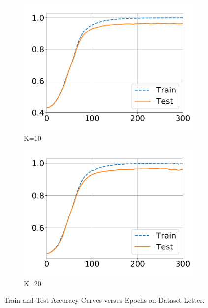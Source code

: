 \begin{figure}[!ht]
\begin{subfigure}{0.33\textwidth}
  \end{subfigure}
  \centering
  \begin{subfigure}{.33\textwidth}
    \centering
    \includegraphics[width=1\linewidth]{images/supply/train_curves/letter_10.pdf}
    \vspace{-0.8cm}
    \caption{K=10}
  \end{subfigure}
  \centering
  \begin{subfigure}{.33\textwidth}
    \centering
    \includegraphics[width=1\linewidth]{images/supply/train_curves/letter_20.pdf}
    \vspace{-0.8cm}
    \caption{K=20}
  \end{subfigure}
  \vspace{-0.3cm}
  \caption{Train and Test Accuracy Curves versus Epochs on Dataset Letter.}
  \label{fig:class-letter}
  \vspace{0.2cm}
\end{figure}




